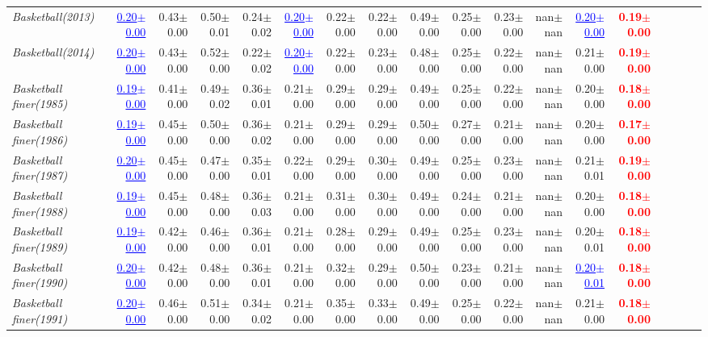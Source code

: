 \documentclass[nohyperref]{article}
\theoremstyle{plain}
\theoremstyle{definition}
\theoremstyle{remark}
\newcommand{\red}[1]{\textcolor{red}{\textbf{#1}}}
\newcommand{\blue}[1]{\textcolor{blue}{\underline{#1}}}
\begin{document}
\begin{table*}[!ht]
{\begin{tabular}{lrrrrrrrrrrrrrrrrr}
			{\it Basketball(2013)} & \blue{0.20$\pm$0.00} & 0.43$\pm$0.00 & 0.50$\pm$0.01 & 0.24$\pm$0.02 & \blue{0.20$\pm$0.00} & 0.22$\pm$0.00 & 0.22$\pm$0.00 & 0.49$\pm$0.00 & 0.25$\pm$0.00 & 0.23$\pm$0.00 & nan$\pm$nan & \blue{0.20$\pm$0.00} & \red{0.19$\pm$0.00} \\
			{\it Basketball(2014)} & \blue{0.20$\pm$0.00} & 0.43$\pm$0.00 & 0.52$\pm$0.00 & 0.22$\pm$0.02 & \blue{0.20$\pm$0.00} & 0.22$\pm$0.00 & 0.23$\pm$0.00 & 0.48$\pm$0.00 & 0.25$\pm$0.00 & 0.22$\pm$0.00 & nan$\pm$nan & 0.21$\pm$0.00 & \red{0.19$\pm$0.00} \\
			{\it Basketball finer(1985)} & \blue{0.19$\pm$0.00} & 0.41$\pm$0.00 & 0.49$\pm$0.02 & 0.36$\pm$0.01 & 0.21$\pm$0.00 & 0.29$\pm$0.00 & 0.29$\pm$0.00 & 0.49$\pm$0.00 & 0.25$\pm$0.00 & 0.22$\pm$0.00 & nan$\pm$nan & 0.20$\pm$0.00 & \red{0.18$\pm$0.00} \\
			{\it Basketball finer(1986)} & \blue{0.19$\pm$0.00} & 0.45$\pm$0.00 & 0.50$\pm$0.00 & 0.36$\pm$0.02 & 0.21$\pm$0.00 & 0.29$\pm$0.00 & 0.29$\pm$0.00 & 0.50$\pm$0.00 & 0.27$\pm$0.00 & 0.21$\pm$0.00 & nan$\pm$nan & 0.20$\pm$0.00 & \red{0.17$\pm$0.00} \\
			{\it Basketball finer(1987)} & \blue{0.20$\pm$0.00} & 0.45$\pm$0.00 & 0.47$\pm$0.00 & 0.35$\pm$0.01 & 0.22$\pm$0.00 & 0.29$\pm$0.00 & 0.30$\pm$0.00 & 0.49$\pm$0.00 & 0.25$\pm$0.00 & 0.23$\pm$0.00 & nan$\pm$nan & 0.21$\pm$0.01 & \red{0.19$\pm$0.00} \\
			{\it Basketball finer(1988)} & \blue{0.19$\pm$0.00} & 0.45$\pm$0.00 & 0.48$\pm$0.00 & 0.36$\pm$0.03 & 0.21$\pm$0.00 & 0.31$\pm$0.00 & 0.30$\pm$0.00 & 0.49$\pm$0.00 & 0.24$\pm$0.00 & 0.21$\pm$0.00 & nan$\pm$nan & 0.20$\pm$0.00 & \red{0.18$\pm$0.00} \\
			{\it Basketball finer(1989)} & \blue{0.19$\pm$0.00} & 0.42$\pm$0.00 & 0.46$\pm$0.00 & 0.36$\pm$0.01 & 0.21$\pm$0.00 & 0.28$\pm$0.00 & 0.29$\pm$0.00 & 0.49$\pm$0.00 & 0.25$\pm$0.00 & 0.23$\pm$0.00 & nan$\pm$nan & 0.20$\pm$0.01 & \red{0.18$\pm$0.00} \\
			{\it Basketball finer(1990)} & \blue{0.20$\pm$0.00} & 0.42$\pm$0.00 & 0.48$\pm$0.00 & 0.36$\pm$0.01 & 0.21$\pm$0.00 & 0.32$\pm$0.00 & 0.29$\pm$0.00 & 0.50$\pm$0.00 & 0.23$\pm$0.00 & 0.21$\pm$0.00 & nan$\pm$nan & \blue{0.20$\pm$0.01} & \red{0.18$\pm$0.00} \\
			{\it Basketball finer(1991)} & \blue{0.20$\pm$0.00} & 0.46$\pm$0.00 & 0.51$\pm$0.00 & 0.34$\pm$0.02 & 0.21$\pm$0.00 & 0.35$\pm$0.00 & 0.33$\pm$0.00 & 0.49$\pm$0.00 & 0.25$\pm$0.00 & 0.22$\pm$0.00 & nan$\pm$nan & 0.21$\pm$0.00 & \red{0.18$\pm$0.00} \\

\end{tabular}}
\end{table*}
\end{document}
